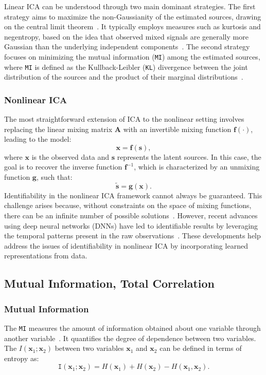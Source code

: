\documentclass{article}
\begin{document}
Linear ICA can be understood through two main dominant strategies. The first strategy aims to maximize the non-Gaussianity of the estimated sources, drawing on the central limit theorem~\cite{lecam1986clt}. It typically employs measures such as kurtosis and negentropy, based on the idea that observed mixed signals are generally more Gaussian than the underlying independent components~\cite{pati2021independent}. The second strategy focuses on minimizing the mutual information (\texttt{MI}) among the estimated sources, where \texttt{MI} is defined as the Kullback-Leibler (\texttt{KL}) divergence between the joint distribution of the sources and the product of their marginal distributions~\cite{bell1995information}.

\subsubsection{Nonlinear ICA} 
\hspace{1.2em} The most straightforward extension of ICA to the nonlinear setting involves replacing the linear mixing matrix \(\mathbf{A}\) with an invertible mixing function \(\mathbf{f}(\cdot)\), leading to the model:
\[
\mathbf{x} = \mathbf{f}(\mathbf{s}),
\]
where \(\mathbf{x}\) is the observed data and \(\mathbf{s}\) represents the latent sources. In this case, the goal is to recover the inverse function \(\mathbf{f}^{-1}\), which is characterized by an unmixing function \(\mathbf{g}\), such that:
\[
\mathbf{\tilde{s}} = \mathbf{g}(\mathbf{x}).
\]
\hspace{1.2em} Identifiability in the nonlinear ICA framework cannot always be guaranteed. This challenge arises because, without constraints on the space of mixing functions, there can be an infinite number of possible solutions~\cite{hyvarinen1999nonlinear}. However, recent advances using deep neural networks (DNNs) have led to identifiable results by leveraging the temporal patterns present in the raw observations~\cite{belghazi2018mutual}. These developments help address the issues of identifiability in nonlinear ICA by incorporating learned representations from data.

\subsection{Mutual Information, Total Correlation}
\subsubsection{Mutual Information}
\hspace{1.2em} The \texttt{MI} measures the amount of information obtained about one variable through another variable~\cite{cover1991information}. It quantifies the degree of dependence between two variables. The \( I(\mathbf{x}_1; \mathbf{x}_2) \) between two variables \( \mathbf{x}_1 \) and \( \mathbf{x}_2 \) can be defined in terms of entropy as:
\begin{equation}
\texttt{I}(\mathbf{x}_1; \mathbf{x}_2) = H(\mathbf{x}_1) + H(\mathbf{x}_2) - H(\mathbf{x}_1, \mathbf{x}_2).    
\end{equation}
\end{document}
